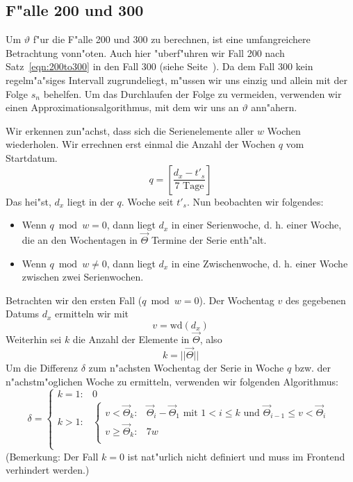 \documentclass[a4paper]{article}
\newcommand*{\wdf}{\mathrm{wd}}
\numberwithin{equation}{section}
\begin{document}
%
%
\subsection{F"alle 200 und 300}
Um $\vartheta$ f"ur die F"alle 200 und 300 zu berechnen, ist eine umfangreichere
Betrachtung vonn"oten. Auch hier "uberf"uhren wir Fall 200 nach
Satz~\ref{eqn:200to300} in den Fall 300 (siehe Seite~\pageref{eqn:200to300}). Da
dem Fall 300 kein regelm"a"siges Intervall zugrundeliegt, m"ussen wir uns einzig
und allein mit der Folge $s_n$ behelfen. Um das Durchlaufen der Folge zu
vermeiden, verwenden wir einen Approximationsalgorithmus, mit dem wir uns an
$\vartheta$ ann"ahern.

Wir erkennen zun"achst, dass sich die Serienelemente aller $w$ Wochen
wiederholen. Wir errechnen erst einmal die Anzahl der Wochen $q$ vom Startdatum.
\begin{equation}
  q = \left[\frac{d_x - t'_s}{7 \textrm{ Tage}}\right]
\end{equation}
Das hei"st, $d_x$ liegt in der $q$. Woche seit $t'_s$. Nun beobachten wir
folgendes:
\begin{itemize}
\item Wenn $q \bmod w = 0$, dann liegt $d_x$ in einer Serienwoche, d. h. einer
  Woche, die an den Wochentagen in $\vec{\Theta}$ Termine der Serie enth"alt.
\item Wenn $q \bmod w \ne 0$, dann liegt $d_x$ in eine Zwischenwoche, d. h.
  einer Woche zwischen zwei Serienwochen.
\end{itemize}

\noindent Betrachten wir den ersten Fall ($q \bmod w = 0$). Der Wochentag $v$
des gegebenen Datums $d_x$ ermitteln wir mit
\begin{equation}v = \wdf(d_x)\end{equation}
Weiterhin sei $k$ die Anzahl der Elemente in $\vec{\Theta}$, also
\begin{equation}k = ||\vec{\Theta}||\end{equation}
Um die Differenz $\delta$ zum n"achsten Wochentag der Serie in Woche $q$ bzw.
der n"achstm"oglichen Woche zu ermitteln, verwenden wir folgenden Algorithmus:
\begin{equation}
  \delta = \left\{\begin{array}{ll}
    k = 1 : & 0 \\
    k > 1 : & \left\{\begin{array}{ll}
      v < \vec{\Theta}_k: & \vec{\Theta}_i - \vec{\Theta}_{1} \textrm{ mit }
      1 < i \le k \textrm{ und } \vec{\Theta}_{i-1} \le v < \vec{\Theta}_i \\
      v \ge \vec{\Theta}_k: & 7w \\
      \end{array}\right. \\
    \end{array}\right.
\end{equation}
(Bemerkung: Der Fall $k = 0$ ist nat"urlich nicht definiert und muss im Frontend
verhindert werden.)
\end{document}
